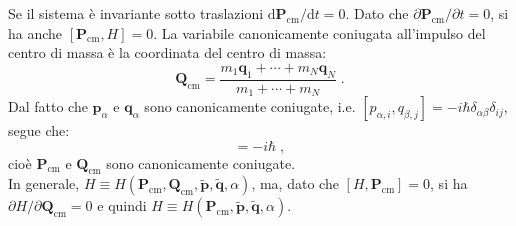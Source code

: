 \documentclass[10pt,a4paper]{report}
\theoremstyle{definition}
\numberwithin{equation}{section}
\newcommand{\diff}[1][]{\mathrm{d}#1}
\begin{document}
Se il sistema è invariante sotto traslazioni $\diff{\mathbf{P}_{\mathrm{cm}}}/\diff{t}=0$. Dato che $\partial\mathbf{P}_{\mathrm{cm}}/\partial t=0$, si ha anche $[\mathbf{P}_{\mathrm{cm}},H]=0$. La variabile canonicamente coniugata all'impulso del centro di massa è la coordinata del centro di massa:
\begin{equation}
\mathbf{Q}_{\mathrm{cm}}=\frac{m_1\mathbf{q}_1+\cdots+m_N\mathbf{q}_N}{m_1+\cdots+m_N}\;.
\end{equation}
Dal fatto che $\mathbf{p}_{\alpha}$ e $\mathbf{q}_{\alpha}$ sono canonicamente coniugate, i.e. $[p_{\alpha,i},q_{\beta,j}]=-i\hbar\delta_{\alpha\beta}\delta_{ij}$, segue che:
\begin{equation}
[\mathbf{P}_{\mathrm{cm}},\mathbf{Q}_{\mathrm{cm}}]=-i\hbar\;,
\end{equation}
cioè $\mathbf{P}_{\mathrm{cm}}$ e $\mathbf{Q}_{\mathrm{cm}}$ sono canonicamente coniugate. \\
In generale, $H\equiv H(\mathbf{P}_{\mathrm{cm}},\mathbf{Q}_{\mathrm{cm}},\tilde{\mathbf{p}},\tilde{\mathbf{q}},\alpha)$, ma, dato che $[H,\mathbf{P}_{\mathrm{cm}}]=0$, si ha $\partial H/\partial \mathbf{Q}_{\mathrm{cm}}=0$ e quindi $H\equiv H(\mathbf{P}_{\mathrm{cm}},\tilde{\mathbf{p}},\tilde{\mathbf{q}},\alpha)$.
\end{document}
